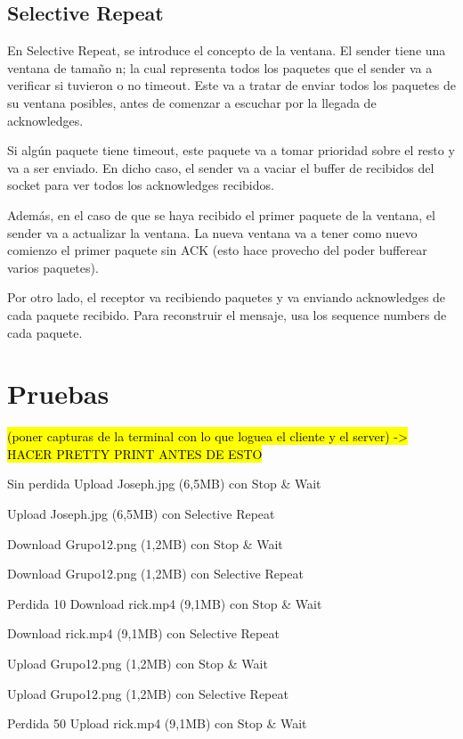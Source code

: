 \documentclass{article}
\begin{document}
\subsection{Selective Repeat}\label{selective-repeat}

En Selective Repeat, se introduce el concepto de la ventana. El sender
tiene una ventana de tamaño n; la cual representa todos los paquetes que
el sender va a verificar si tuvieron o no timeout. Este va a tratar de
enviar todos los paquetes de su ventana posibles, antes de comenzar a
escuchar por la llegada de acknowledges.

Si algún paquete tiene timeout, este paquete va a tomar prioridad sobre
el resto y va a ser enviado. En dicho caso, el sender va a vaciar el
buffer de recibidos del socket para ver todos los acknowledges
recibidos.

Además, en el caso de que se haya recibido el primer paquete de la
ventana, el sender va a actualizar la ventana. La nueva ventana va a
tener como nuevo comienzo el primer paquete sin ACK (esto hace provecho
del poder bufferear varios paquetes).

Por otro lado, el receptor va recibiendo paquetes y va enviando
acknowledges de cada paquete recibido. Para reconstruir el mensaje, usa
los sequence numbers de cada paquete.

\section{\texorpdfstring{\textbf{Pruebas}}{Pruebas}}\label{pruebas-wip}

\hl{(poner capturas de la terminal con lo que loguea el cliente y el
server) -\textgreater{} HACER PRETTY PRINT ANTES DE ESTO}

Sin perdida
Upload Joseph.jpg (6,5MB) con Stop & Wait

Upload Joseph.jpg (6,5MB) con Selective Repeat


Download Grupo12.png (1,2MB) con Stop & Wait

Download Grupo12.png (1,2MB) con Selective Repeat

Perdida 10%
Download rick.mp4 (9,1MB) con Stop & Wait

Download rick.mp4 (9,1MB) con Selective Repeat


Upload Grupo12.png (1,2MB) con Stop & Wait

Upload Grupo12.png (1,2MB) con Selective Repeat


Perdida 50%
Upload rick.mp4 (9,1MB) con Stop & Wait
\end{document}
